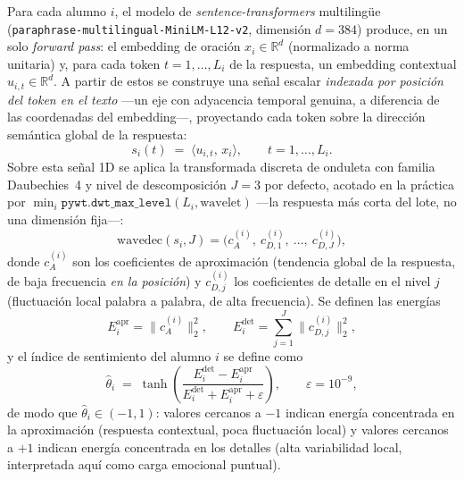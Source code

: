 \documentclass[11pt,a4paper,oneside]{article}
\theoremstyle{definition}
\begin{document}
Para cada alumno $i$, el modelo de \emph{sentence-transformers} multilingüe
(\texttt{paraphrase-\allowbreak multilingual-\allowbreak MiniLM-\allowbreak L12-\allowbreak v2},
dimensión $d=384$) \cite{ReimersGurevych2019} produce, en un solo
\emph{forward pass}: el embedding de oración $x_i\in\mathbb{R}^d$ (normalizado a norma unitaria)
y, para cada token $t=1,\ldots,L_i$ de la respuesta, un embedding contextual
$u_{i,t}\in\mathbb{R}^d$. A partir de estos se construye una señal escalar \emph{indexada por
posición del token en el texto} —un eje con adyacencia temporal genuina, a diferencia de las
coordenadas del embedding—, proyectando cada token sobre la dirección semántica global de la
respuesta:
\[
s_i(t) \;=\; \langle u_{i,t},\, x_i\rangle, \qquad t=1,\ldots,L_i.
\]
Sobre esta señal 1D se aplica la transformada discreta de onduleta \cite{Mallat1989} con familia
Daubechies~4 y nivel de descomposición $J=3$ por defecto, acotado en la práctica por
$\min_i \texttt{pywt.dwt\_max\_level}(L_i,\text{wavelet})$ —la respuesta más corta del lote,
no una dimensión fija—:
\[
\mathrm{wavedec}(s_i, J) = \big(c^{(i)}_A,\ c^{(i)}_{D,1},\ \ldots,\ c^{(i)}_{D,J}\big),
\]
donde $c^{(i)}_A$ son los coeficientes de aproximación (tendencia global de la respuesta, de
baja frecuencia \emph{en la posición}) y $c^{(i)}_{D,j}$ los coeficientes de detalle en el nivel
$j$ (fluctuación local palabra a palabra, de alta frecuencia). Se definen las energías
\[
E^{\mathrm{apr}}_i = \big\lVert c^{(i)}_A \big\rVert_2^2,
\qquad
E^{\mathrm{det}}_i = \sum_{j=1}^{J} \big\lVert c^{(i)}_{D,j} \big\rVert_2^2 ,
\]
y el índice de sentimiento del alumno $i$ se define como
\[
\hat\theta_i \;=\; \tanh\!\left(\frac{E^{\mathrm{det}}_i - E^{\mathrm{apr}}_i}
{E^{\mathrm{det}}_i + E^{\mathrm{apr}}_i + \varepsilon}\right), \qquad \varepsilon = 10^{-9},
\]
de modo que $\hat\theta_i\in(-1,1)$: valores cercanos a $-1$ indican energía concentrada en la
aproximación (respuesta contextual, poca fluctuación local) y valores cercanos a $+1$ indican
energía concentrada en los detalles (alta variabilidad local, interpretada aquí como carga
emocional puntual).
\end{document}
